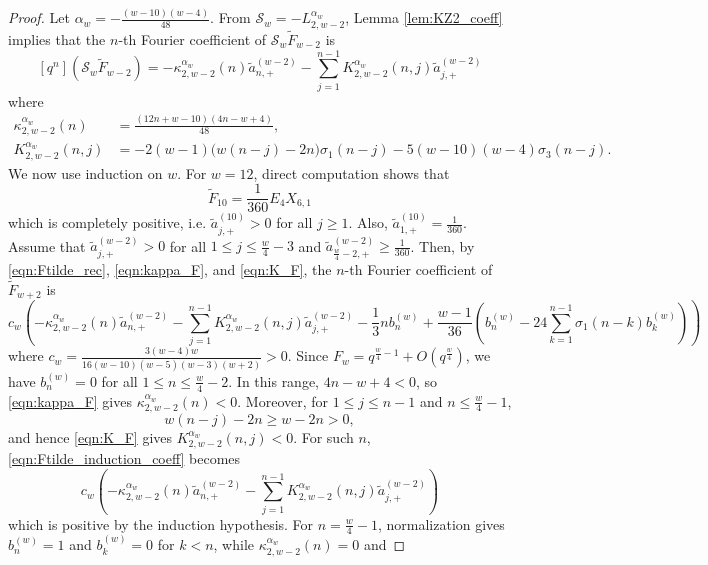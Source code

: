 \documentclass[10pt,a4paper]{amsart}
\newcommand{\cS}{\mathcal{S}}
\newcommand{\wtilde}{\widetilde}
\begin{document}
\begin{proof}
    Let $\alpha_w = - \frac{(w-10)(w-4)}{48}$.
    From $\cS_w = -L_{2,w-2}^{\alpha_w}$, Lemma \ref{lem:KZ2_coeff} implies that the $n$-th Fourier coefficient of $\cS_w \wtilde{F}_{w-2}$ is
    \[
        [q^n](\cS_w \wtilde{F}_{w-2}) = -\kappa_{2,w-2}^{\alpha_w}(n) \tilde{a}_{n,+}^{(w-2)} - \sum_{j=1}^{n-1} K_{2,w-2}^{\alpha_w}(n, j) \tilde{a}_{j,+}^{(w-2)}
    \]
    where
    \begin{align}
        \kappa_{2,w-2}^{\alpha_w}(n) &= \frac{(12n + w - 10)(4n - w + 4)}{48} \label{eqn:kappa_F}, \\
        K_{2,w-2}^{\alpha_w}(n,j) &= -2(w-1)\bigl(w(n-j)-2n\bigr)\sigma_1(n-j) - 5(w-10)(w-4)\sigma_3(n-j). \label{eqn:K_F}
    \end{align}
    We now use induction on $w$.
    For $w = 12$, direct computation shows that
    \[
    \wtilde{F}_{10} = \frac{1}{360} E_4 X_{6,1}
    \]
    which is completely positive, i.e. $\tilde{a}_{j,+}^{(10)} > 0$ for all $j \ge 1$.
    Also, $\tilde{a}_{1,+}^{(10)} = \frac{1}{360}$.
    Assume that $\tilde{a}_{j,+}^{(w-2)} > 0$ for all $1 \le j \le \frac{w}{4} - 3$ and $\tilde{a}_{\frac{w}{4}-2,+}^{(w-2)} \ge \frac{1}{360}$.
    Then, by \eqref{eqn:Ftilde_rec}, \eqref{eqn:kappa_F}, and \eqref{eqn:K_F}, the $n$-th Fourier coefficient of $\wtilde{F}_{w+2}$ is
    \begin{equation}
        \label{eqn:Ftilde_induction_coeff}
        c_w\left(-\kappa_{2,w-2}^{\alpha_w}(n) \tilde{a}_{n,+}^{(w-2)} - \sum_{j=1}^{n-1} K_{2,w-2}^{\alpha_w}(n,j)\tilde{a}_{j,+}^{(w-2)} - \frac{1}{3}n b_n^{(w)} + \frac{w-1}{36}\left(b_n^{(w)} - 24 \sum_{k=1}^{n-1} \sigma_1(n-k) b_k^{(w)}\right)\right)
    \end{equation}
    where $c_w = \frac{3(w-4)w}{16(w-10)(w-5)(w-3)(w+2)}>0$.
    Since $F_w = q^{\frac{w}{4} - 1} + O(q^{\frac{w}{4}})$, we have $b_n^{(w)} = 0$ for all $1 \leq n \leq \frac{w}{4} - 2$.
    In this range, $4n-w+4<0$, so \eqref{eqn:kappa_F} gives $\kappa_{2,w-2}^{\alpha_w}(n)<0$. Moreover, for $1\leq j\leq n-1$ and $n\leq\frac{w}{4}-1$,
    \[
        w(n-j)-2n \geq w-2n>0,
    \]
    and hence \eqref{eqn:K_F} gives $K_{2,w-2}^{\alpha_w}(n,j)<0$.
    For such $n$, \eqref{eqn:Ftilde_induction_coeff} becomes
    \[
        c_w\left(- \kappa_{2,w-2}^{\alpha_w}(n) \tilde{a}_{n,+}^{(w-2)} - \sum_{j=1}^{n-1} K_{2,w-2}^{\alpha_w}(n,j)\tilde{a}_{j,+}^{(w-2)}\right)
    \]
    which is positive by the induction hypothesis.
    For $n = \frac{w}{4} - 1$, normalization gives $b_n^{(w)}=1$ and $b_k^{(w)}=0$ for $k<n$, while $\kappa_{2,w-2}^{\alpha_w}(n) = 0$ and

\end{proof}
\end{document}
